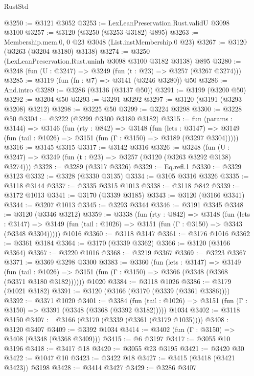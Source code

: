 \begin{lexlean}{RustStd}
\begin{coremodule}
{\begin{coremodule}
{{{{{{{{{{{{{{{{{{{{{{{{{{@3250 := @3121 @3052
@3253 := LexLeanPreservation.Rust.validU @3098 @3100
@3257 := @3120 (@3250 (@3253 @3182) @895)
@3263 := Membership.mem.{0, 0} @23 @3048 (List.instMembership.{0} @23)
@3267 := @3120 (@3263 (@3204 @3180) @3138)
@3274 := @3250 (LexLeanPreservation.Rust.uninh @3098 @3100 @3182 @3138) @895
@3280 := @3248 (fun (U : @3247) => @3249 (fun (t : @23) => @3257 (@3267 @3274)))
@3285 := @3119 (fun (fn : @7) => @3141 (@3246 @3280)) @50
@3286 := And.intro
@3289 := @3286 (@3136 (@3137 @50))
@3291 := @3199 (@3200 @50)
@3292 := @3204 @50
@3293 := @3291 @3292
@3297 := @3120 (@3191 (@3293 @3208) @3212)
@3298 := @3225 @50
@3299 := @3224 @3298
@3300 := @3228 @50
@3304 := @3222 (@3299 @3300 @3180 @3182)
@3315 := fun (params : @3144) =>
  @3146
    (fun (rty : @842) =>
    @3148
      (fun (lets : @3147) =>
      @3149 (fun (tail : @1026) => @3151 (fun (Γ : @3150) => @3189 (@3297 @3304)))))
@3316 := @3145 @3315
@3317 := @3142 @3316
@3326 := @3248 (fun (U : @3247) => @3249 (fun (t : @23) => @3257 (@3120 (@3263 @3292 @3138) @3274)))
@3328 := @3289 (@3317 @3326)
@3329 := Eq.refl.{1}
@3330 := @3329 @3123
@3332 := @3328 (@3330 @3135)
@3334 := @3105 @3316 @3326
@3335 := @3118 @3144
@3337 := @3335 @3315 @1013
@3338 := @3118 @842
@3339 := @3172 @1013
@3341 := @3170 (@3339 @3185)
@3343 := @3120 (@3166 @3341)
@3344 := @3207 @1013
@3345 := @3293 @3344
@3346 := @3191 @3345
@3348 := @3120 (@3346 @3212)
@3359 := @3338
    (fun (rty : @842) =>
    @3148
      (fun (lets : @3147) =>
      @3149 (fun (tail : @1026) => @3151 (fun (Γ : @3150) => @3343 (@3348 @3304)))))
    @1016
@3360 := @3118 @3147
@3361 := @3176 @1016
@3362 := @3361 @3184
@3364 := @3170 (@3339 @3362)
@3366 := @3120 (@3166 @3364)
@3367 := @3220 @1016
@3368 := @3219 @3367
@3369 := @3223 @3367
@3371 := @3369 @3298 @3300
@3383 := @3360
    (fun (lets : @3147) =>
    @3149
      (fun (tail : @1026) => @3151 (fun (Γ : @3150) => @3366 (@3348 (@3368 (@3371 @3180 @3182))))))
    @1020
@3384 := @3118 @1026
@3386 := @3179 (@1021 @3182)
@3391 := @3120 (@3166 (@3170 (@3339 (@3361 @3386))))
@3392 := @3371 @1020
@3401 := @3384
    (fun (tail : @1026) => @3151 (fun (Γ : @3150) => @3391 (@3348 (@3368 (@3392 @3182)))))
    @1034
@3402 := @3118 @3150
@3407 := @3166 (@3170 (@3339 (@3361 (@3179 @1035))))
@3408 := @3120 @3407
@3409 := @3392 @1034
@3414 := @3402 (fun (Γ : @3150) => @3408 (@3348 (@3368 @3409)))
@3415 := @6 @3197
@3417 := @3055 @10 @3196
@3418 := @3417 @18
@3420 := @3055 @23 @3195
@3421 := @3420 @30
@3422 := @1047 @10
@3423 := @3422 @18
@3427 := @3415 (@3418 (@3421 @3423)) @3198
@3428 := @3414 @3427
@3429 := @3286 @3407
}}}}}}}}}}}}}}}}}}}}}}}}}}
\end{coremodule}}
\end{coremodule}
\end{lexlean}

